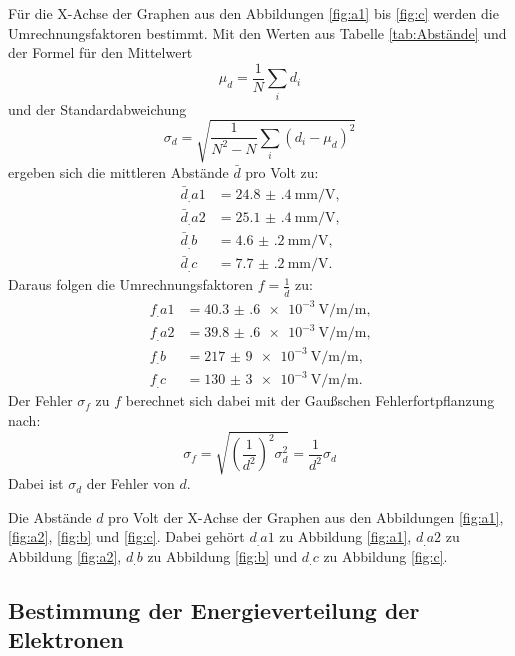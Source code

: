 Für die X-Achse der Graphen aus den Abbildungen \ref{fig:a1} bis \ref{fig:c} werden die Umrechnungsfaktoren bestimmt.
Mit den Werten aus Tabelle \ref{tab:Abstände} und der Formel für den Mittelwert
\[
\mu_d = \frac{1}{N}\sum_i d_i
\]
und der Standardabweichung
\[
\sigma_d = \sqrt{\frac{1}{N^2-N}\sum_i \left(d_i-\mu_d\right)^2}
\]
ergeben sich die mittleren Abstände $\bar{d}$ pro Volt zu:
\begin{align*}
\bar{d}_.{a1} &= \SI{24.8(4)}{\milli\metre\per\volt}\text{,}\\
\bar{d}_.{a2} &= \SI{25.1(4)}{\milli\metre\per\volt}\text{,}\\
\bar{d}_.{b}  &= \SI{4.6(2)}{\milli\metre\per\volt}\text{,}\\
\bar{d}_.{c}  &= \SI{7.7(2)}{\milli\metre\per\volt}\text{.}
\end{align*}
Daraus folgen die Umrechnungsfaktoren $f=\frac{1}{\bar{d}}$ zu:
\begin{align}
f_.{a1} &= \SI{40.3(6)e-3}{\volt\per\milli\per\metre}\text{,}\label{eq:fa1}\\
f_.{a2} &= \SI{39.8(6)e-3}{\volt\per\milli\per\metre}\text{,}\label{eq:fa2}\\
f_.{b}  &= \SI{217(9)e-3}{\volt\per\milli\per\metre}\text{,}\label{eq:fb}\\
f_.{c}  &= \SI{130(3)e-3}{\volt\per\milli\per\metre}\text{.}\label{eq:fc}
\end{align}
Der Fehler $\sigma_{f}$ zu $f$ berechnet sich dabei mit der Gaußschen Fehlerfortpflanzung nach:
\[
\sigma_{f} = \sqrt{\left(\frac{1}{d^2}\right)^2\sigma_d^2} = \frac{1}{d^2}\sigma_d
\]
Dabei ist $\sigma_d$ der Fehler von $d$.

\begin{table}
\centering
\caption{Die Abstände $d$ pro Volt der X-Achse der Graphen aus den Abbildungen \ref{fig:a1}, \ref{fig:a2}, \ref{fig:b} und \ref{fig:c}. Dabei gehört $d_.{a1}$ zu Abbildung \ref{fig:a1}, $d_.{a2}$ zu Abbildung \ref{fig:a2}, $d_.{b}$ zu Abbildung \ref{fig:b} und $d_.{c}$ zu Abbildung \ref{fig:c}.}

\label{tab:Abstände}
\end{table}

\subsection{Bestimmung der Energieverteilung der Elektronen}

